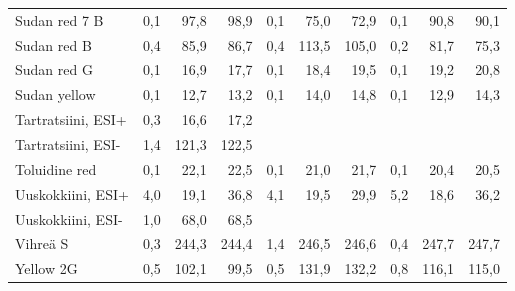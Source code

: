 \begin{table}[htbp]
\begin{tabular}{lrrrrrrrrr}
    Sudan red 7 B & 0,1   & 97,8  & 98,9  & 0,1   & 75,0  & 72,9  & 0,1   & 90,8  & 90,1 \\
    Sudan red B & 0,4   & 85,9  & 86,7  & 0,4   & 113,5 & 105,0 & 0,2   & 81,7  & 75,3 \\
    Sudan red G & 0,1   & 16,9  & 17,7  & 0,1   & 18,4  & 19,5  & 0,1   & 19,2  & 20,8 \\
    Sudan yellow & 0,1   & 12,7  & 13,2  & 0,1   & 14,0  & 14,8  & 0,1   & 12,9  & 14,3 \\
    Tartratsiini, ESI+ & 0,3   & 16,6  & 17,2  &       &       &       &       &       &  \\
    Tartratsiini, ESI- & 1,4   & 121,3 & 122,5 &       &       &       &       &       &  \\
    Toluidine red & 0,1   & 22,1  & 22,5  & 0,1   & 21,0  & 21,7  & 0,1   & 20,4  & 20,5 \\
    Uuskokkiini, ESI+ & 4,0   & 19,1  & 36,8  & 4,1   & 19,5  & 29,9  & 5,2   & 18,6  & 36,2 \\
    Uuskokkiini, ESI- & 1,0   & 68,0  & 68,5  &       &       &       &       &       &  \\
    Vihreä S & 0,3   & 244,3 & 244,4 & 1,4   & 246,5 & 246,6 & 0,4   & 247,7 & 247,7 \\
    Yellow 2G & 0,5   & 102,1 & 99,5  & 0,5   & 131,9 & 132,2 & 0,8   & 116,1 & 115,0 \\
    \bottomrule
    \end{tabular}%
\end{table}%
